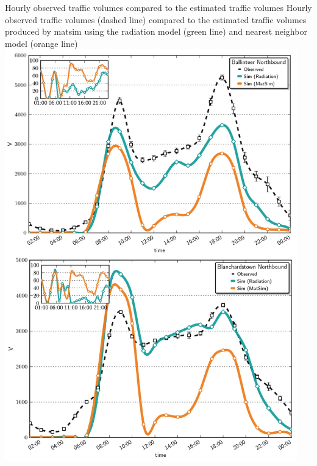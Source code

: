 \createfigure%
{Hourly observed traffic volumes compared to the estimated traffic volumes}%
{Hourly observed traffic volumes (dashed line) compared to the estimated traffic volumes produced by \gls{matsim} using the radiation model (green line) and nearest neighbor model (orange line)}%
{\label{fig:dublin1}}%
{\includegraphics[width=0.95\textwidth, angle=0]{scenarios/figures/dublin1.png}}%
{}






